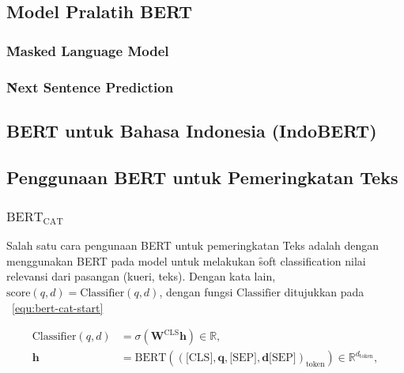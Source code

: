 	\subsection{Model Pralatih BERT}

		\subsubsection{\f{Masked Language Model}}


		\subsubsection{\f{Next Sentence Prediction}}

	\subsection{BERT untuk Bahasa Indonesia (IndoBERT)}

	\subsection{Penggunaan BERT untuk Pemeringkatan Teks}
		\subsubsection{$\text{BERT}_{\text{CAT}}$}

		Salah satu cara pengunaan BERT untuk pemeringkatan Teks adalah dengan menggunakan BERT pada
		model untuk melakukan \f{soft classification} nilai relevansi dari pasangan (kueri, teks). Dengan kata lain, $\text{score}(q,d) = \text{Classifier}(q,d)$, dengan fungsi $\text{Classifier}$
		ditujukkan pada \equ~\ref{equ:bert-cat-start}

		\begin{align}
			\label{equ:bert-cat-start}
			\text{Classifier}(q,d) &= \sigma\left(\mathbf{W}^{\text{CLS}} \mathbf{h}\right) \in \mathbb{R}, \\
			\mathbf{h} &= \text{BERT}((\text{[CLS]},\mathbf{q},\text{[SEP]},\mathbf{d}\text{[SEP]})_{\text{token}}) \in \mathbb{R}^{d_{\text{token}}}, \\
		\end{align}






